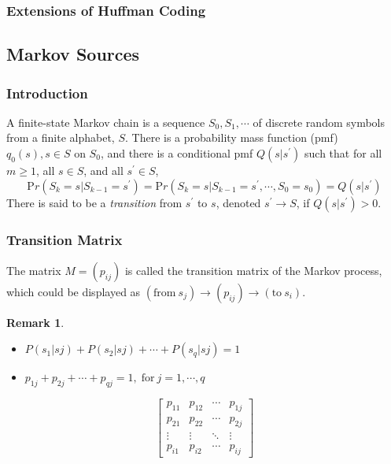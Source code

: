 \documentclass{article}
\newtheorem*{remark}{Remark}
\begin{document}
\subsubsection{Extensions of Huffman Coding}

\subsection{Markov Sources}

\subsubsection{Introduction}

A finite-state Markov chain is a sequence $S_{0},S_{1}, \cdots$ of discrete random sym­bols from a finite alphabet, $S$. There is a probability mass function (pmf) $q_{0}(s), s \in S$ on $S_{0}$, and there is a conditional pmf $Q(s|s^{\prime})$ such that for all $m \geq 1$, all $s \in S$, and all $s^{\prime} \in S$,
    \[{\mathrm Pr}(S_{k}=s|S_{k-1}=s^{\prime})={\mathrm Pr}(S_{k}=s|S_{k-1}=s^{\prime},\cdots,S_{0}=s_{0})=Q(s|s^{\prime})\]
    There is said to be a \emph{transition} from $s^{\prime}$ to $s$, denoted $s^{\prime} \to S$, if $Q(s|s^{\prime})>0$. \cite{mitCh2}

\subsubsection{Transition Matrix}

The matrix $M = (p_{ij})$ is called the transition matrix of the Markov process, which could be displayed as $(\mathrm{from}\ s_{j}) \rightarrow (p_{ij}) \rightarrow (\mathrm{to}\ s_{i})$.

\begin{remark}
    \mbox{}
    \begin{itemize}
        \item \quad $P(s_{1}|s{j}) + P(s_{2}|s{j}) + \cdots + P(s_{q}|s{j}) = 1$
        \item \quad $p_{1j} + p_{2j} + \cdots + p_{qj} = 1, \; \mathrm{for}\ j = 1, \cdots, q$
    \end{itemize}
\end{remark}

\[
\begin{bmatrix}
    p_{11} & p_{12} & \cdots & p_{1j} \\
    p_{21} & p_{22} & \cdots & p_{2j} \\
    \vdots & \vdots & \ddots & \vdots \\
    p_{i1} & p_{i2} & \cdots & p_{ij}
\end{bmatrix}
\]
\end{document}
